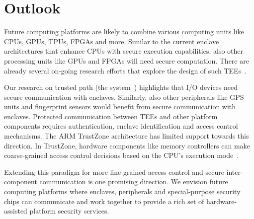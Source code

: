 
\section*{Outlook}



Future computing platforms are likely to combine various computing units like CPUs, GPUs, TPUs, FPGAs and more. %
Similar to the current enclave architectures that enhance CPUs with secure execution capabilities, also other processing units like GPUs and FPGAs will need secure computation. There are already several on-going research efforts that explore the design of such TEEs~\cite{volos2018graviton}.

Our research on trusted path (the \protection system~\cite{protection}) highlights that I/O devices need secure communication with enclaves. Similarly, also other peripherals like GPS units and fingerprint sensors would benefit from secure communication with enclaves. Protected communication between TEEs and other platform components requires authentication, enclave identification and access control mechanisms. The ARM TrustZone architecture has limited support towards this direction. In TrustZone, hardware components like memory controllers can make coarse-grained access control decisions based on the CPU's execution mode~\cite{ekberg2014untapped}. 


Extending this paradigm for more fine-grained access control and secure inter-component communication is one promising direction. We envision future computing platforms where enclaves, peripherals and special-purpose security chips can communicate and work together to provide a rich set of hardware-assisted platform security services.
